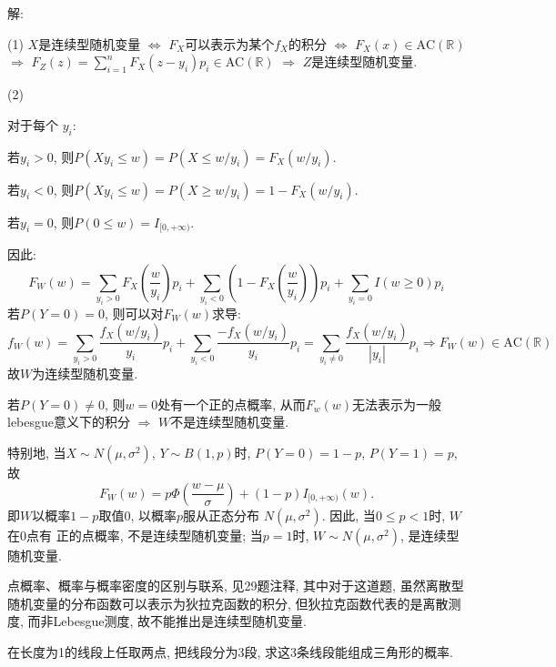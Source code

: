 \documentclass[standard]{ExBook}
\renewenvironment{shaded}{%
  \def\FrameCommand{\fboxsep=\FrameSep \colorbox{shadecolor}}%
  \MakeFramed{\advance\hsize-\width \FrameRestore}%
}{%
  \endMakeFramed
}
\begin{document}
\begin{qitems}
解: 

(1) $X$是连续型随机变量 $\Longleftrightarrow$ $F_{X}$可以表示为某个$f_{X}$的积分 $\Longleftrightarrow$ $F_{X}(x)\in \text{AC}(\mathbb{R})$ $\Longrightarrow$ $F_{Z}(z)=\sum\limits_{i=1}^{n}F_{X}(z-y_{i})p_{i}\in \text{AC}(\mathbb{R})$ $\Longrightarrow$ $Z$是连续型随机变量.

(2)

对于每个 $y_i$:

若$y_i > 0$, 则$P(X y_i \leq w) = P(X \leq w / y_i) = F_X(w / y_i)$.

若$y_i < 0$, 则$P(X y_i \leq w) = P(X \geq w / y_i) = 1 - F_X(w / y_i)$.

若$y_i = 0$, 则$P(0 \leq w) = I_{[0,+\infty)}$.

因此:
\[
F_W(w) = \sum_{y_i > 0} F_X\left(\frac{w}{y_i}\right) p_i + \sum_{y_i < 0} \left(1 - F_X\left(\frac{w}{y_i}\right)\right) p_i + \sum_{y_i = 0} I(w \geq 0) p_i
\]
若$P(Y=0)=0$, 则可以对$F_W(w)$求导:
\[
f_W(w) = \sum_{y_i > 0} \frac{f_X(w / y_i)}{y_i} p_i + \sum_{y_i < 0} \frac{-f_X(w / y_i)}{y_i} p_i=\sum_{y_i \neq 0} \frac{f_X(w / y_i)}{|y_i|} p_i
\Longrightarrow
F_{W}(w)\in \text{AC}(\mathbb{R})
\]
故$W$为连续型随机变量.

若$P(Y=0)\neq0$, 则$w=0$处有一个正的点概率, 从而$F_{w}(w)$无法表示为一般lebesgue意义下的积分 $\Longrightarrow$ $W$不是连续型随机变量.

特别地, 当$X\sim N(\mu,\sigma^2)$, $Y\sim B(1,p)$时,
$P(Y=0)=1-p$, $P(Y=1)=p$, 故
\[
F_W(w)
=p\Phi\left(\frac{w-\mu}{\sigma}\right)
+(1-p)I_{[0,+\infty)}(w).
\]
即$W$以概率$1-p$取值$0$, 以概率$p$服从正态分布
$N(\mu,\sigma^2)$. 因此, 当$0\leq p<1$时, $W$在$0$点有
正的点概率, 不是连续型随机变量; 当$p=1$时,
$W\sim N(\mu,\sigma^2)$, 是连续型随机变量.

\textcolor{themeColor}{\selectfont {} 点概率、概率与概率密度的区别与联系, 见29题注释, 其中对于这道题, 虽然离散型随机变量的分布函数可以表示为狄拉克函数的积分, 但狄拉克函数代表的是离散测度, 而非Lebesgue测度, 故不能推出是连续型随机变量.}

\vspace{2.5cm-5em}

    \begin{bbox}
    \begin{shaded}
        \qitem
在长度为1的线段上任取两点, 把线段分为3段, 求这3条线段能组成三角形的概率.
    \end{shaded}
    \end{bbox}

\vspace{\dimexpr2.5cm-5em\relax}


\end{qitems}
\end{document}
